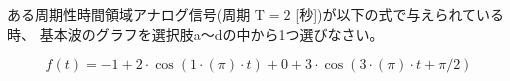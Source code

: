 ある周期性時間領域アナログ信号(周期 $\textrm{T} = 2$ [秒])が以下の式で与えられている時、
基本波のグラフを選択肢a〜dの中から1つ選びなさい。

\[
f(t) = 
-1
+ 2 \cdot \cos( 1 \cdot ( \pi ) \cdot t )
+ 0
+ 3 \cdot \cos( 3 \cdot ( \pi ) \cdot t + \pi/2 )
\]
